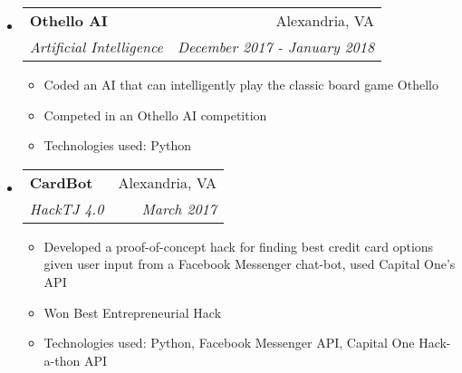 \documentclass[letterpaper,11pt]{article}
\makeatletter
\newcommand{\resitem}[1]{\item #1 \vspace{-2pt}}
\newcommand{\ressubheading}[4]{
\begin{tabular*}{7.0in}{l@{\extracolsep{\fill}}r}
		\textbf{#1} & #2 \\
		\textit{#3} & \textit{#4} \\
\end{tabular*}\vspace{-6pt}}
\makeatother
\begin{document}
\begin{itemize}
\item
    \ressubheading{Othello AI}{Alexandria, VA}{Artificial Intelligence}{December 2017 - January 2018}
    \begin{itemize}
        \resitem{Coded an AI that can intelligently play the classic board game Othello}
        \resitem{Competed in an Othello AI competition}
        \resitem{Technologies used: Python}
    \end{itemize}
\item
    \ressubheading{CardBot}{Alexandria, VA}{HackTJ 4.0}{March 2017}
    \begin{itemize}
        \resitem{Developed a proof-of-concept hack for finding best credit card options given user input from a Facebook Messenger chat-bot, used Capital One's API}
        \resitem{Won Best Entrepreneurial Hack}
        \resitem{Technologies used: Python, Facebook Messenger API, Capital One Hack-a-thon API}
    \end{itemize}
\end{itemize}

\end{document}
